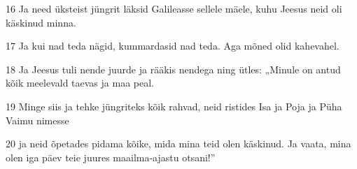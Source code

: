 \par 16 Ja need üksteist jüngrit läksid Galileasse sellele mäele, kuhu Jeesus neid oli käskinud minna.
\par 17 Ja kui nad teda nägid, kummardasid nad teda. Aga mõned olid kahevahel.
\par 18 Ja Jeesus tuli nende juurde ja rääkis nendega ning ütles: „Minule on antud kõik meelevald taevas ja maa peal.
\par 19 Minge siis ja tehke jüngriteks kõik rahvad, neid ristides Isa ja Poja ja Püha Vaimu nimesse
\par 20 ja neid õpetades pidama kõike, mida mina teid olen käskinud. Ja vaata, mina olen iga päev teie juures maailma-ajastu otsani!”






